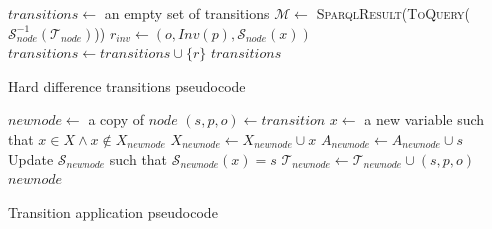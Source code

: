 \documentclass[a4paper,11pt,twoside]{StyleThese}
\begin{document}
\begin{algorithm}[H]
\begin{algorithmic}[1]
\State $transitions\leftarrow$ an empty set of transitions
\State $\mathcal{M}\leftarrow$ \textsc{SparqlResult}(\textsc{ToQuery}($\mathcal{S}_{node}^{-1}(\mathcal{T}_{node})$))
			 \label{line:harddiff}
				\State $r_{inv} \leftarrow (o, Inv(p), \mathcal{S}_{node}(x))$
					\State $transitions \leftarrow transitions \cup \{r\}$
				\EndIf
			\EndFor
		\EndIf
	\EndFor
\EndFor
\State \Return $transitions$
\EndFunction
\end{algorithmic}
 \caption{Hard difference transitions pseudocode}
 \label{alg:harddifftrans}
\end{algorithm}

\begin{algorithm}[H]
\begin{algorithmic}[1]
\State $newnode \leftarrow$ a copy of $node$
\State $(s, p, o) \leftarrow transition$
	\State $x \leftarrow$ a new variable such that $x \in X \land x \notin X_{newnode}$
	\State $X_{newnode} \leftarrow X_{newnode} \cup x$
	\State $A_{newnode} \leftarrow A_{newnode} \cup s$
	\State Update $\mathcal{S}_{newnode}$ such that $\mathcal{S}_{newnode}(x) = s$ \label{line:updatesymboltable}
\EndIf
\State $\mathcal{T}_{newnode} \leftarrow \mathcal{T}_{newnode} \cup (s, p, o)$
\State \Return $newnode$
\EndFunction
\end{algorithmic}
 \caption{Transition application pseudocode}
 \label{alg:transapply}
\end{algorithm}
\end{document}
